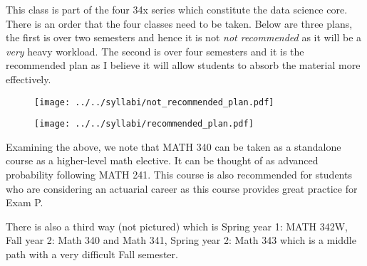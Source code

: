 

This class is part of the four 34x series which constitute the data science core. There is an order that the four classes need to be taken. Below are three plans, the first is over two semesters and hence it is not \emph{not recommended} as it will be a \emph{very} heavy workload. The second is over four semesters and it is the recommended plan as I believe it will allow students to absorb the material more effectively. 

\begin{figure}[htp]
\centering
\texttt{[image: ../../syllabi/not\_recommended\_plan.pdf]}
\label{fig:not_recommended}
\end{figure} 

\begin{figure}[htp]
\centering
\texttt{[image: ../../syllabi/recommended\_plan.pdf]}
\label{fig:recommended}
\end{figure} 

Examining the above, we note that MATH 340 can be taken as a standalone course as a higher-level math elective. It can be thought of as advanced probability following MATH 241. This course is also recommended for students who are considering an actuarial career as this course provides great practice for Exam P.

There is also a third way (not pictured) which is Spring year 1: MATH 342W, Fall year 2: Math 340 and Math 341, Spring year 2: Math 343 which is a middle path with a very difficult Fall semester. 